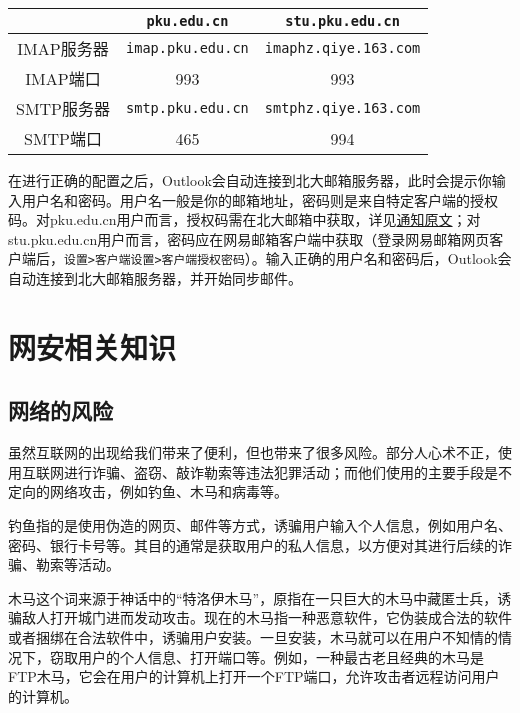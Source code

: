 \documentclass[../main.tex]{subfiles}
\begin{document}
\begin{table}[ht]
  \centering
  \begin{tabular}{c|c|c}
    \hline
    & \texttt{pku.edu.cn} & \texttt{stu.pku.edu.cn} \\
    \hline
    IMAP服务器 & \texttt{imap.pku.edu.cn} & \texttt{imaphz.qiye.163.com} \\
    IMAP端口 & 993 & 993 \\
    \hline
    SMTP服务器 & \texttt{smtp.pku.edu.cn} & \texttt{smtphz.qiye.163.com} \\
    SMTP端口 & 465 & 994 \\
    \hline
  \end{tabular}
\end{table}

在进行正确的配置之后，Outlook会自动连接到北大邮箱服务器，此时会提示你输入用户名和密码。用户名一般是你的邮箱地址，密码则是来自特定客户端的授权码。对pku.edu.cn用户而言，授权码需在北大邮箱中获取，详见\href{https://its.pku.edu.cn/announce/tz20250702100126.jsp}{通知原文}；对stu.pku.edu.cn用户而言，密码应在网易邮箱客户端中获取（登录网易邮箱网页客户端后，\texttt{设置>客户端设置>客户端授权密码}）。输入正确的用户名和密码后，Outlook会自动连接到北大邮箱服务器，并开始同步邮件。

\section{网安相关知识} %

\subsection{网络的风险}

虽然互联网的出现给我们带来了便利，但也带来了很多风险。部分人心术不正，使用互联网进行诈骗、盗窃、敲诈勒索等违法犯罪活动；而他们使用的主要手段是不定向的网络攻击，例如钓鱼、木马和病毒等。

钓鱼指的是使用伪造的网页、邮件等方式，诱骗用户输入个人信息，例如用户名、密码、银行卡号等。其目的通常是获取用户的私人信息，以方便对其进行后续的诈骗、勒索等活动。

木马这个词来源于神话中的“特洛伊木马”，原指在一只巨大的木马中藏匿士兵，诱骗敌人打开城门进而发动攻击。现在的木马指一种恶意软件，它伪装成合法的软件或者捆绑在合法软件中，诱骗用户安装。一旦安装，木马就可以在用户不知情的情况下，窃取用户的个人信息、打开端口等。例如，一种最古老且经典的木马是FTP木马，它会在用户的计算机上打开一个FTP端口，允许攻击者远程访问用户的计算机。
\end{document}
